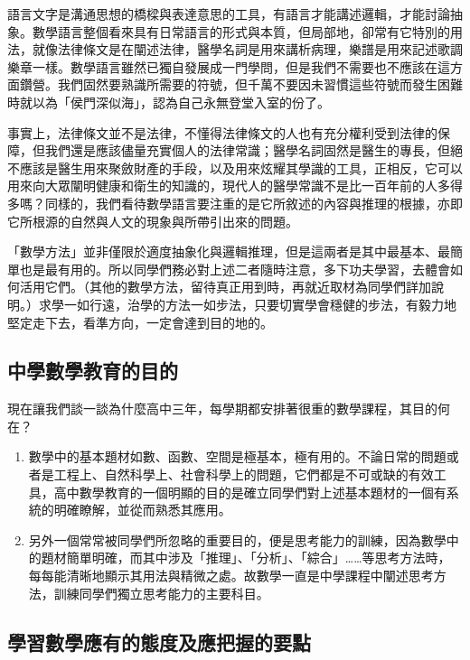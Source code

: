語言文字是溝通思想的橋樑與表達意思的工具，有語言才能講述邏輯，才能討論抽象。數學語言整個看來具有日常語言的形式與本質，但局部地，卻常有它特別的用法，就像法律條文是在闡述法律，醫學名詞是用來講析病理，樂譜是用來記述歌調樂章一樣。數學語言雖然已獨自發展成一門學問，但是我們不需要也不應該在這方面鑽營。我們固然要熟識所需要的符號，但千萬不要因未習慣這些符號而發生困難時就以為「侯門深似海」，認為自己永無登堂入室的份了。

事實上，法律條文並不是法律，不懂得法律條文的人也有充分權利受到法律的保障，但我們還是應該儘量充實個人的法律常識；醫學名詞固然是醫生的專長，但絕不應該是醫生用來聚斂財產的手段，以及用來炫耀其學識的工具，正相反，它可以用來向大眾闡明健康和衛生的知識的，現代人的醫學常識不是比一百年前的人多得多嗎？同樣的，我們看待數學語言要注重的是它所敘述的內容與推理的根據，亦即它所根源的自然與人文的現象與所帶引出來的問題。

「數學方法」並非僅限於適度抽象化與邏輯推理，但是這兩者是其中最基本、最簡單也是最有用的。所以同學們務必對上述二者隨時注意，多下功夫學習，去體會如何活用它們。（其他的數學方法，留待真正用到時，再就近取材為同學們詳加說明。）求學一如行遠，治學的方法一如步法，只要切實學會穩健的步法，有毅力地堅定走下去，看準方向，一定會達到目的地的。

\subsection{中學數學教育的目的}\label{sec:1-3}

現在讓我們談一談為什麼高中三年，每學期都安排著很重的數學課程，其目的何在？

\begin{enumerate}[(一)]
  \item 數學中的基本題材如數、函數、空間是極基本，極有用的。不論日常的問題或者是工程上、自然科學上、社會科學上的問題，它們都是不可或缺的有效工具，高中數學教育的一個明顯的目的是確立同學們對上述基本題材的一個有系統的明確瞭解，並從而熟悉其應用。
  \item 另外一個常常被同學們所忽略的重要目的，便是思考能力的訓練，因為數學中的題材簡單明確，而其中涉及「推理」、「分析」、「綜合」……等思考方法時，每每能清晰地顯示其用法與精微之處。故數學一直是中學課程中闡述思考方法，訓練同學們獨立思考能力的主要科目。
\end{enumerate}

\subsection{學習數學應有的態度及應把握的要點}\label{sec:1-4}


